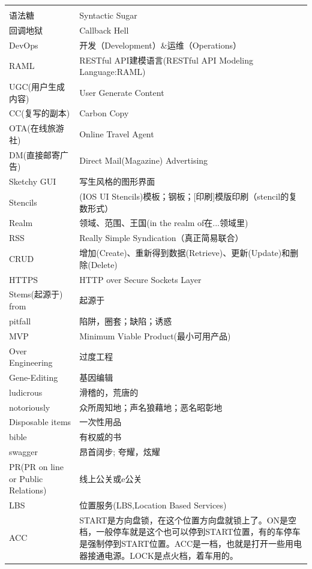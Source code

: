 \documentclass{book}
\begin{document}
\begin{longtable}{lp{8cm}}
	\multirow{1}{*}{}			
	& \multicolumn{1}{c}{}\\
	语法糖 & Syntactic Sugar\footnotemark[5]\\
	回调地狱 & Callback Hell\\
	DevOps  & 开发（Development）\&运维（Operations）\\
	RAML & RESTful API建模语言(RESTful API Modeling Language:RAML)\\
	UGC(用户生成内容) & User Generate Content\\
	CC(复写的副本) & Carbon Copy\\
	OTA(在线旅游社) & Online Travel Agent\\
	DM(直接邮寄广告) & Direct Mail(Magazine) Advertising\\
	Sketchy GUI & 写生风格的图形界面\\
	Stencils & (IOS UI Stencils)模板；钢板；[印刷]模版印刷（stencil的复数形式）\\
	Realm & 领域、范围、王国(in the realm of在...领域里)\\
	RSS & Really Simple Syndication（真正简易联合）\\
	CRUD & 增加(Create)、重新得到数据(Retrieve)、更新(Update)和删除(Delete)\\
	HTTPS & HTTP over Secure Sockets Layer\\
	Stems(起源于) from & 起源于\\
	pitfall & 陷阱，圈套；缺陷；诱惑\\
	MVP & Minimum Viable Product(最小可用产品)\\
	Over Engineering & 过度工程\\
	Gene-Editing & 基因编辑\\
	ludicrous & 滑稽的，荒唐的\\
	notoriously & 众所周知地；声名狼藉地；恶名昭彰地\\
	Disposable items & 一次性用品\\
	bible & 有权威的书\\
	swagger & 昂首阔步; 夸耀，炫耀\\
	PR(PR on line or Public Relations) & 线上公关或e公关\\
	LBS & 位置服务(LBS,Location Based Services)\\
	ACC & START是方向盘锁，在这个位置方向盘就锁上了。ON是空档，一般停车就是这个也可以停到START位置，有的车停车是强制停到START位置。ACC是一档，也就是打开一些用电器接通电源。LOCK是点火档，着车用的。\\
\end{longtable}
\end{document}
